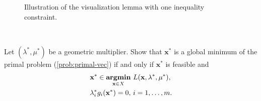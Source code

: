 \documentclass[11pt,letter,notitlepage]{article}
\DeclareMathOperator*{\argmin}{\bf argmin}
\begin{document}
\begin{figure}[!h] 
	\caption{Illustration of the visualization lemma with one inequality constraint.}
	\label{fig:visualization-lemma}
\end{figure}



\newpage
${}$
\newpage
\begin{exercise}
Let $(\lambda^*,\mu^*)$ be a geometric multiplier. Show that $\mathbf{x}^*$ is a global minimum of the primal problem (\ref{prob:primal-vec}) if and only if $\mathbf{x}^*$ is feasible and 
\begin{align*}
	&\mathbf{x}^*\in\argmin_{\mathbf{x}\in X}\,L(\mathbf{x},\lambda^*,\mu^*),\\
	&\lambda_i^*g_i(\mathbf{x}^*)=0,\,i=1,\ldots,m.
\end{align*}
\end{exercise}
\end{document}
